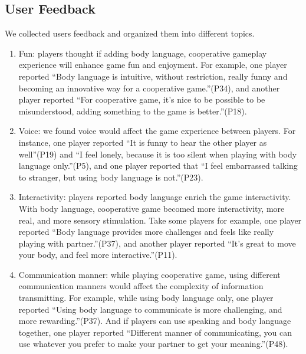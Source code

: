 \subsection{User Feedback}
	We collected users feedback and organized them into different topics.
\begin{enumerate}
  \item Fun:  players thought if adding body language, cooperative gameplay experience will enhance game fun and enjoyment. For example, one player reported ``Body language is intuitive, without restriction, really funny and becoming an innovative way for a cooperative game.''(P34), and another player reported
	``For cooperative game, it's nice to be possible to be misunderstood, adding something to the game is better.''(P18).



  \item Voice: we found voice would affect the game experience between players. For instance, one player reported ``It is funny to hear the other player as well''(P19) and ``I feel lonely, because it is too silent when playing with body language only.''(P5), and one player reported that ``I feel embarrassed talking to stranger, but using body language is not.''(P23).


  \item Interactivity: players reported body language enrich the game interactivity. With body language, cooperative game becomed more interactivity, more real, and more sensory stimulation. Take some players for example, one player reported ``Body language provides more challenges and feels like really playing with partner.''(P37), and another player reported ``It's great to move your body, and feel more interactive.''(P11). 



  \item Communication manner: while playing cooperative game, using different communication manners would affect the complexity of information transmitting. For example, while using body language only, one player reported ``Using body language to communicate is more challenging, and more rewarding.''(P37). And if players can use speaking and body language together, one player reported ``Different manner of communicating, you can use whatever you prefer to make your partner to get your meaning.''(P48). 



\end{enumerate}

